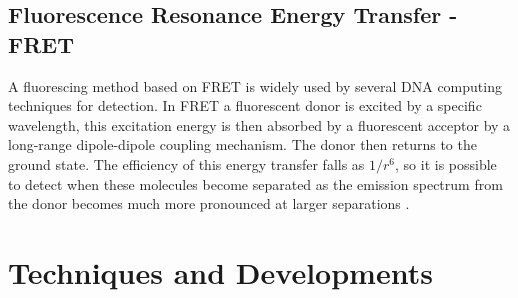 \documentclass[11pt,a4paper,portrait]{article}
\begin{document}
\subsection{Fluorescence Resonance Energy Transfer - FRET}
A fluorescing method based on FRET is widely used by several DNA computing techniques for detection. In FRET a fluorescent donor is excited by a specific wavelength, this excitation energy is then absorbed by a fluorescent acceptor by a long-range dipole-dipole coupling mechanism. The donor then returns to the ground state. The efficiency of this energy transfer falls as $1/r^6$, so it is possible to detect when these molecules become separated as the emission spectrum from the donor becomes much more pronounced at larger separations \cite{Compbio}.

\clearpage
\section{Techniques and Developments}
\end{document}
